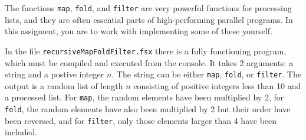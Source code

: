 The functions \lstinline!map!, \lstinline!fold!, and \lstinline!filter! are very powerful functions for processing lists, and they are often essential parts of high-performing parallel programs. In this assigment, you are to work with implementing some of these yourself.

In the file \lstinline[language=console]{recursiveMapFoldFilter.fsx} there is a fully functioning program, which must be compiled and executed from the console. It takes 2 arguments: a string and a postive integer $n$. The string can be either \lstinline[language=console]!map!, \lstinline[language=console]!fold!, or \lstinline[language=console]!filter!. The output is a random list of length $n$ consisting of positive integers less than 10 and a processed list. For \lstinline[language=console]!map!, the random elements have been multiplied by 2, for \lstinline[language=console]!fold!, the random elements have also been multiplied by 2 but their order have been reversed, and for \lstinline[language=console]!filter!, only those elements larger than 4 have been included.
